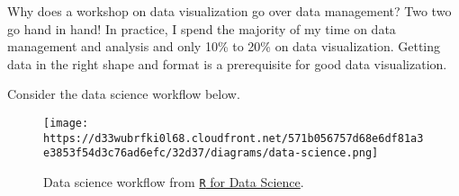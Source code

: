 \documentclass[]{article}
\begin{document}
Why does a workshop on data visualization go over data management? Two
two go hand in hand! In practice, I spend the majority of my time on
data management and analysis and only 10\% to 20\% on data
visualization. Getting data in the right shape and format is a
prerequisite for good data visualization.

Consider the data science workflow below.

\begin{figure}
\centering
\texttt{[image: https://d33wubrfki0l68.cloudfront.net/571b056757d68e6df81a3e3853f54d3c76ad6efc/32d37/diagrams/data-science.png]}
\caption{Data science workflow from
\href{https://r4ds.had.co.nz}{\texttt{R} for Data Science}.}
\end{figure}
\end{document}
